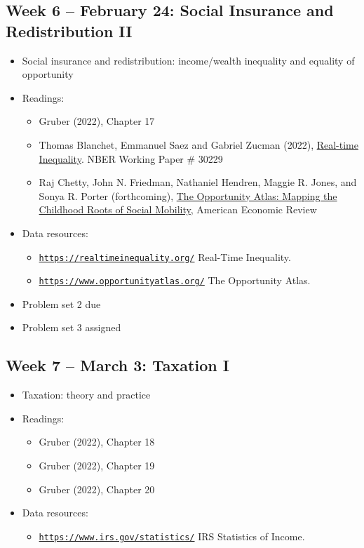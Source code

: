 \documentclass[11pt]{article}
\begin{document}
\subsection*{Week 6 -- February 24: Social Insurance and Redistribution II}
\begin{itemize}
    \setlength{\itemsep}{0em}
    \item Social insurance and redistribution: income/wealth inequality and equality of opportunity
    \item Readings:
    \begin{itemize}
        \item Gruber (2022), Chapter 17
        \item Thomas Blanchet, Emmanuel Saez and Gabriel Zucman (2022), \href{https://eml.berkeley.edu/~saez/BSZ2022.pdf}{Real-time Inequality}. NBER Working Paper \# 30229
        \item Raj Chetty, John N. Friedman, Nathaniel Hendren, Maggie R. Jones, and Sonya R. Porter (forthcoming), \href{https://opportunityinsights.org/paper/the-opportunity-atlas/}{The Opportunity Atlas: Mapping the Childhood Roots of Social Mobility}, American Economic Review
    \end{itemize}
    \item Data resources:
    \begin{itemize}
        \item \href{https://realtimeinequality.org/}{\nolinkurl{https://realtimeinequality.org/}} Real-Time Inequality.
        \item \href{https://www.opportunityatlas.org/}{\nolinkurl{https://www.opportunityatlas.org/}} The Opportunity Atlas.
    \end{itemize}
    \item Problem set 2 due
    \item Problem set 3 assigned
\end{itemize}

\subsection*{Week 7 -- March 3: Taxation I}
\begin{itemize}
    \setlength{\itemsep}{0em}
    \item Taxation: theory and practice
    \item Readings:
    \begin{itemize}
        \item Gruber (2022), Chapter 18
        \item Gruber (2022), Chapter 19
        \item Gruber (2022), Chapter 20
    \end{itemize}
    \item Data resources:
    \begin{itemize}
        \item \href{https://www.irs.gov/statistics/}{\nolinkurl{https://www.irs.gov/statistics/}} IRS Statistics of Income.
    \end{itemize}
\end{itemize}
\end{document}
